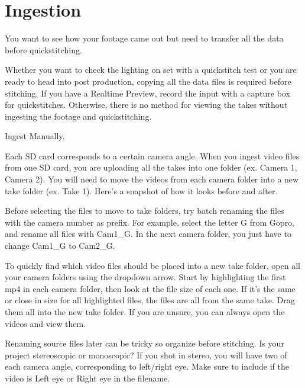 \chapter{Ingestion}
\pagecolor{white}
\label{chap:29}
\begin{fullwidth}

\problem

{\large You want to see how your footage came out but need to transfer all the data before quickstitching. \par}

Whether you want to check the lighting on set with a quickstitch test or you are ready to head into post production, copying all the data files is required before stitching. If you have a Realtime Preview, record the input with a capture box for quickstitches. Otherwise, there is no method for viewing the takes without ingesting the footage and quickstitching. 

\solution

{\large Ingest Manually. \par}

Each SD card corresponds to a certain camera angle. When you ingest video files from one SD card, you are uploading all the takes into one folder (ex. Camera 1, Camera 2). You will need to move the videos from each camera folder into a new take folder (ex. Take 1). Here's a snapshot of how it looks before and after.


\tip Before selecting the files to move to take folders, try batch renaming the files with the camera number as prefix. For example, select the letter G from Gopro, and rename all files with Cam1\_G. In the next camera folder, you just have to change Cam1\_G to Cam2\_G.


To quickly find which video files should be placed into a new take folder, open all your camera folders using the dropdown arrow. Start by highlighting the first mp4 in each camera folder, then look at the file size of each one. If it's the same or close in size for all highlighted files, the files are all from the same take. Drag them all into the new take folder. If you are unsure, you can always open the videos and view them.

Renaming source files later can be tricky so organize before stitching. Is your project stereoscopic or monoscopic? If you shot in stereo, you will have two of each camera angle, corresponding to left/right eye. Make sure to include if the video is Left eye or Right eye in the filename.


\end{fullwidth}
